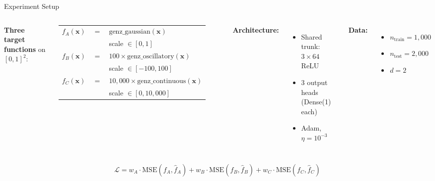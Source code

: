 \documentclass[aspectratio=169,11pt]{beamer}
\newcommand{\x}{\bm{x}}
\begin{document}
\begin{frame}{Experiment Setup}
\begin{columns}[T]
\textbf{Three target functions} on $[0,1]^2$:

\vspace{0.2cm}
\begin{tabular}{@{}lrl@{}}
$f_A(\x)$ & $=$ & $\text{genz\_gaussian}(\x)$ \\
           &     & scale $\in [0, 1]$ \\[4pt]
$f_B(\x)$ & $=$ & $100 \times \text{genz\_oscillatory}(\x)$ \\
           &     & scale $\in [-100, 100]$ \\[4pt]
$f_C(\x)$ & $=$ & $10{,}000 \times \text{genz\_continuous}(\x)$ \\
           &     & scale $\in [0, 10{,}000]$ \\
\end{tabular}

\textbf{Architecture:}
\begin{itemize}
    \item Shared trunk: $3 \times 64$ ReLU
    \item 3 output heads (Dense(1) each)
    \item Adam, $\eta = 10^{-3}$
\end{itemize}

\vspace{0.2cm}
\textbf{Data:}
\begin{itemize}
    \item $n_\text{train} = 1{,}000$
    \item $n_\text{test} = 2{,}000$
    \item $d = 2$
\end{itemize}
\end{columns}

\vspace{0.3cm}
\[
    \mathcal{L} = w_A \cdot \text{MSE}(f_A, \hat{f}_A) + w_B \cdot \text{MSE}(f_B, \hat{f}_B) + w_C \cdot \text{MSE}(f_C, \hat{f}_C)
\]
\end{frame}
\end{document}
